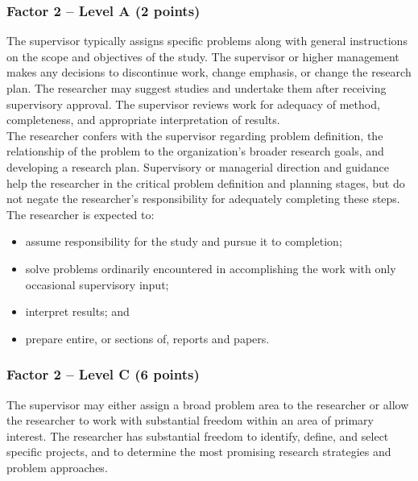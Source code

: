 \subsubsection*{Factor 2 – Level A (2 points)}

The supervisor typically assigns specific problems along with general instructions on the scope and objectives of the study.
The supervisor or higher management makes any decisions to discontinue work, change emphasis, or change the research plan.
The researcher may suggest  studies and undertake them after receiving supervisory approval.
The supervisor reviews work for adequacy of method, completeness, and appropriate interpretation of results. \\

The researcher confers with the supervisor regarding problem definition, the relationship of the problem to the organization’s broader research goals, and developing a research plan. 
Supervisory or managerial direction and guidance help the researcher in the critical problem definition and planning stages, but do not negate the researcher’s responsibility for adequately completing these steps.  \\

The researcher is expected to:

\begin{itemize}
  \item assume responsibility for the study and pursue it to completion;
  \item solve problems ordinarily encountered in accomplishing the work with only occasional supervisory input;
  \item interpret results; and
  \item prepare entire, or sections of, reports and papers.
\end{itemize}

\subsubsection*{Factor 2 -- Level C (6 points)}

The supervisor may either assign a broad problem area to the researcher or allow the researcher to work with substantial freedom within an area of primary interest.
The researcher has substantial freedom to identify, define, and select specific projects, and to determine the most promising research strategies and problem approaches. \\

